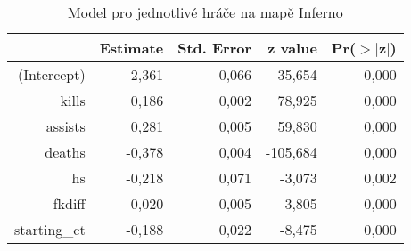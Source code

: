 \begin{table}[H]
\centering
\begin{tabular}{rrrrr}
  \hline
 & Estimate & Std. Error & z value & Pr($>$$|$z$|$) \\ 
  \hline
(Intercept) & 2,361 & 0,066 & 35,654 & 0,000 \\ 
  kills & 0,186 & 0,002 & 78,925 & 0,000 \\ 
  assists & 0,281 & 0,005 & 59,830 & 0,000 \\ 
  deaths & -0,378 & 0,004 & -105,684 & 0,000 \\ 
  hs & -0,218 & 0,071 & -3,073 & 0,002 \\ 
  fkdiff & 0,020 & 0,005 & 3,805 & 0,000 \\ 
  starting\_ct & -0,188 & 0,022 & -8,475 & 0,000 \\ 
   \hline
\end{tabular}
\caption{\label{tab:player_model_Inferno}Model pro jednotlivé hráče na mapě Inferno} 
\end{table}
